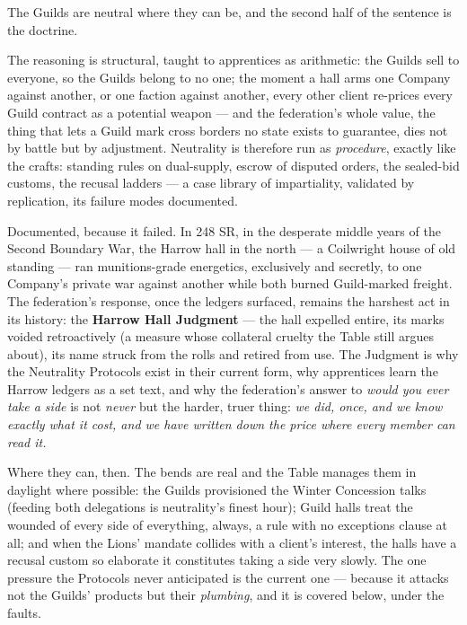 The Guilds are neutral where they can be, and the second half of the sentence is the doctrine.

The reasoning is structural, taught to apprentices as arithmetic: the Guilds sell to everyone, so the Guilds belong to no one; the moment a hall arms one Company against another, or one faction against another, every other client re-prices every Guild contract as a potential weapon --- and the federation's whole value, the thing that lets a Guild mark cross borders no state exists to guarantee, dies not by battle but by adjustment. Neutrality is therefore run as \textit{procedure}, exactly like the crafts: standing rules on dual-supply, escrow of disputed orders, the sealed-bid customs, the recusal ladders --- a case library of impartiality, validated by replication, its failure modes documented.

Documented, because it failed. In 248 SR, in the desperate middle years of the Second Boundary War, the Harrow hall in the north --- a Coilwright house of old standing --- ran munitions-grade energetics, exclusively and secretly, to one Company's private war against another while both burned Guild-marked freight. The federation's response, once the ledgers surfaced, remains the harshest act in its history: the \textbf{Harrow Hall Judgment} --- the hall expelled entire, its marks voided retroactively (a measure whose collateral cruelty the Table still argues about), its name struck from the rolls and retired from use. The Judgment is why the Neutrality Protocols exist in their current form, why apprentices learn the Harrow ledgers as a set text, and why the federation's answer to \textit{would you ever take a side} is not \textit{never} but the harder, truer thing: \textit{we did, once, and we know exactly what it cost, and we have written down the price where every member can read it.}

Where they can, then. The bends are real and the Table manages them in daylight where possible: the Guilds provisioned the Winter Concession talks (feeding both delegations is neutrality's finest hour); Guild halls treat the wounded of every side of everything, always, a rule with no exceptions clause at all; and when the Lions' mandate collides with a client's interest, the halls have a recusal custom so elaborate it constitutes taking a side very slowly. The one pressure the Protocols never anticipated is the current one --- because it attacks not the Guilds' products but their \textit{plumbing}, and it is covered below, under the faults.

